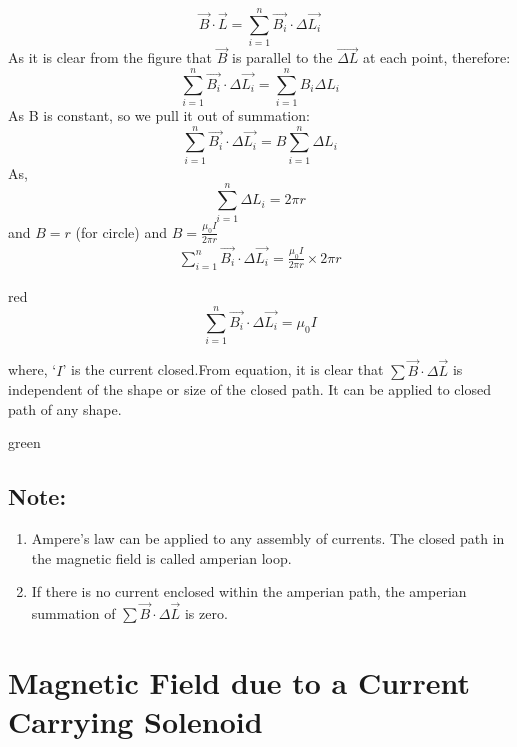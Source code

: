 \begin{equation}\nonumber
\vec{B} \cdot \vec{L}  =  \sum_{i=1}^{n} \vec{B_{i}}\cdot\Delta\vec{L_{i}}
\end{equation}
As it is clear from the figure that $\vec{B}$ is parallel to the $\vec{\Delta L}$ at each point, therefore:
\begin{equation}\nonumber
\sum_{i=1}^{n}\vec{B_{i}}\cdot\Delta\vec{L_{i}}=\sum_{i=1}^{n}B_{i}\Delta{L_{i}}
\end{equation}
As B is constant, so we pull it out of summation:
\begin{equation}\nonumber
\sum_{i=1}^{n} \vec{B_{i}}\cdot\Delta\vec{L_{i}}=B\sum_{i=1}^{n}\Delta{L_{i}}
\end{equation}
As,
\begin{equation}\nonumber
    \sum_{i=1}^{n}\Delta{L_{i}}=2\pi r 
\end{equation}
and $B = r$ (for circle) and  $B = \frac{\mu_{0}I}{2\pi r}$
\begin{equation}
\begin{gathered}
\nonumber
\sum_{i=1}^{n}\vec{B_{i}}\cdot\Delta\vec{L_{i}}=\frac{\mu_{0}I}{2\pi r}\times 2\pi r
\end{gathered}
\end{equation}
\begin{mybox}{red}{}
\begin{equation}\label{eq:13.16}
    \sum_{i=1}^{n} \vec{B_{i}}\cdot\Delta\vec{L_{i}}= \mu_{0}I
\end{equation}
\end{mybox}
where,
‘$I$’ is the current closed.From equation, it is clear that $\sum\vec{B}\cdot\Delta\vec{L}$ is independent of the shape or size of the closed path. It can be applied to closed path of any shape.
\begin{mybox}{green}{}
\subsection*{\note{}Note:}
\begin{enumerate}[label = (\roman*)]
\item Ampere’s law can be applied to any assembly of currents. The closed path in the magnetic field is called amperian loop.
\item If there is no current enclosed within the amperian path, the amperian summation of $\sum\vec{B}\cdot\Delta\vec{L}$ is zero.
\end{enumerate}
\end{mybox}
\section{Magnetic Field due to a Current Carrying Solenoid}
